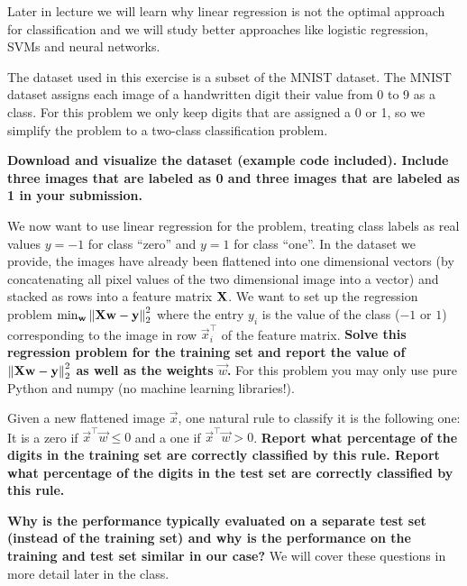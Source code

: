 \documentclass[11pt]{article}
\begin{document}
Later in lecture we will learn why linear regression is not the optimal
approach for classification and we will study better approaches like logistic
regression, SVMs and neural networks.

\begin{Parts}

\Part The dataset used in this exercise is a subset of the MNIST dataset.
The MNIST dataset assigns
each image of a handwritten digit their value from 0 to 9 as a class.
For this problem we only keep digits that are assigned a 0 or 1, so we
simplify the problem to a two-class classification problem.

\textbf{Download and visualize the dataset (example code included). Include three
images that are labeled as 0 and three images that are labeled as 1
in your submission.}



\Part We now want to use linear regression for the problem, treating class
labels as real values $y = -1$ for class ``zero'' and $y = 1$ for class ``one''. In the dataset we
provide, the images have already been flattened into one dimensional vectors
(by concatenating all pixel values of the two dimensional image into a vector)
and stacked as rows into a feature matrix $\mathbf{X}$. We want to set up the regression
problem $\min_{\boldsymbol{\mathbf{w}}}\norm{\mathbf{X}\boldsymbol{\mathbf{w}} - \boldsymbol{\mathbf{y}}}_2^2$ where the entry $y_i$ is the value of the
class ($-1$ or $1$) corresponding to the image in row $\vec{x}_i^\top$ of the feature matrix.
\textbf{Solve this regression problem for the training set and report the value of
$\norm{\mathbf{X}\boldsymbol{\mathbf{w}} - \boldsymbol{\mathbf{y}}}_2^2$ as well as the weights $\vec w$.} For this problem you
may only use pure Python and numpy (no machine learning libraries!).



\Part Given a new flattened image $\vec x$, one natural rule to classify it is
the following one: It is a zero if $\vec x^\top \vec w \leq 0$ and a one if
$\vec x^\top \vec w > 0$. \textbf{Report what percentage of the digits in the training set
are correctly classified by this rule. Report what percentage of the digits in the test
set are correctly classified by this rule.}



\Part \textbf{Why is the performance typically evaluated on a separate test set
(instead of the training set) and why is the performance on the training and
test set similar in our case?} We will cover these questions in more detail
later in the class.



\end{Parts}
\end{document}
